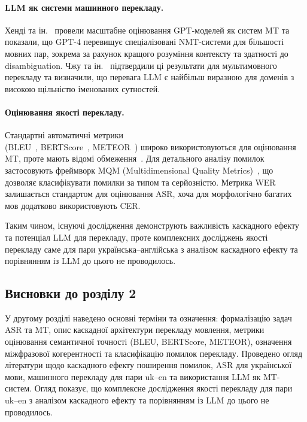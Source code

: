 \paragraph{LLM як системи машинного перекладу.}
Хенді та ін.~\cite{hendy_llm_mt} провели масштабне оцінювання GPT-моделей
як систем MT та показали, що GPT-4 перевищує спеціалізовані NMT-системи
для більшості мовних пар, зокрема за рахунок кращого розуміння контексту
та здатності до disambiguation. Чжу та ін.~\cite{llm_mt} підтвердили
ці результати для мультимовного перекладу та визначили, що перевага LLM
є найбільш виразною для доменів з високою щільністю іменованих сутностей.

\paragraph{Оцінювання якості перекладу.}
Стандартні автоматичні метрики \\(BLEU~\cite{papineni_bleu},
BERTScore~\cite{bert_score}, METEOR~\cite{banerjee_meteor}) широко
використовуються для оцінювання MT, проте мають відомі
обмеження~\cite{post_bleu}. Для детального аналізу помилок застосовують
фреймворк MQM (Multidimensional Quality Metrics)~\cite{mqm}, що
дозволяє класифікувати помилки за типом та серйозністю. Метрика
WER~\cite{wer_metric} залишається стандартом для оцінювання ASR,
хоча для морфологічно багатих мов додатково використовують CER.

Таким чином, існуючі дослідження демонструють важливість каскадного
ефекту та потенціал LLM для перекладу, проте комплексних досліджень
якості перекладу саме для пари українська--англійська з аналізом
каскадного ефекту та порівнянням із LLM до цього не проводилось.

\subsection{Висновки до розділу 2}

У другому розділі наведено основні терміни та означення: формалізацію
задач ASR та MT, опис каскадної архітектури перекладу мовлення, метрики
оцінювання семантичної точності (BLEU, BERTScore, METEOR), означення
міжфразової когерентності та класифікацію помилок перекладу. Проведено
огляд літератури щодо каскадного ефекту поширення помилок, ASR для
української мови, машинного перекладу для пари uk--en та використання
LLM як MT-систем. Огляд показує, що комплексне дослідження якості
перекладу для пари uk--en з аналізом каскадного ефекту та порівнянням
із LLM до цього не проводилось.

\clearpage
